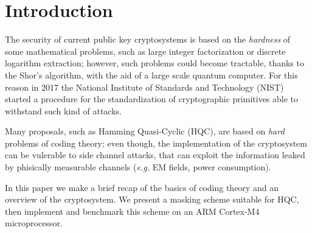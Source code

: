 \section{Introduction}
The security of current public key cryptosystems is based on the \textit{hardness} of some mathematical problems, such as large integer factorization or discrete logarithm extraction; however, such problems could become tractable, thanks to the Shor's algorithm, with the aid of a large scale quantum computer.
For this reason in 2017 the National Institute of Standards and Technology (NIST) started a procedure for the standardization of cryptographic primitives able to withstand such kind of attacks.

Many proposals, such as Hamming Quasi-Cyclic (HQC), are based on \textit{hard} problems of coding theory; even though, the implementation of the cryptosystem can be vulerable to side channel attacks, that can exploit the information leaked by phisically measurable channels (\textit{e.g.} EM fields, power consumption).

In this paper we make a brief recap of the basics of coding theory and an overview of the cryptosystem. We present a masking scheme suitable for HQC, then implement and benchmark this scheme on an ARM Cortex-M4 microprocessor. 
